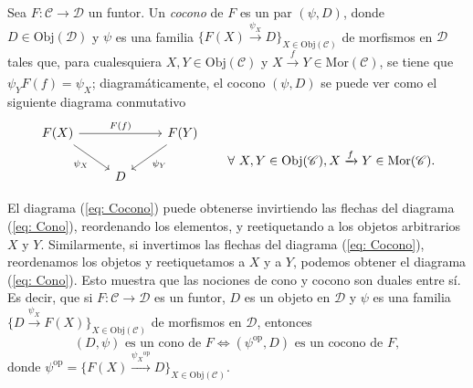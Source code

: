 \documentclass[tesis]{subfiles}
\begin{document}

\begin{Def} \label{Def: Cocono} 
    Sea $F:\mathscr{C}\to \mathscr{D}$ un funtor. Un \emph{cocono} de $F$ es un par $(\psi,D)$, donde $D\in\text{Obj}(\mathscr{D})$ y $\psi$ es una familia $\{F(X)\xrightarrow[]{\psi_X} D\}_{X\in\text{Obj}(\mathscr{C})}$ de morfismos en $\mathscr{D}$ tales que, para cualesquiera $X,Y\in\text{Obj}(\mathscr{C})$ y $X\xrightarrow[]{f} Y\in\text{Mor}(\mathscr{C})$, se tiene que $\psi_YF(f)=\psi_X$; diagramáticamente, el cocono $(\psi,D)$ se puede ver como el siguiente diagrama conmutativo
    \begin{equation}\label{eq: Cocono}
        \begin{tikzcd}
            F(X) \arrow[]{dr}[swap]{\psi_X} \arrow[]{rr}[]{F(f)} &&F(Y) \arrow[]{dl}[]{\psi_Y} &&&&\empty{} \arrow[phantom]{d}[]{\forall \ X,Y\in\text{Obj}(\mathscr{C}), X\xrightarrow[]{f} Y\in\text{Mor}(\mathscr{C}).} \\
                                                                 &D &&&&&\empty{} 
        \end{tikzcd}
    \end{equation}
\end{Def}

\begin{Obs}\label{Observaciones del cocono}
    El diagrama (\ref{eq: Cocono}) puede obtenerse invirtiendo las flechas del diagrama (\ref{eq: Cono}), reordenando los elementos, y reetiquetando a los objetos arbitrarios $X$ y $Y$. Similarmente, si invertimos las flechas del diagrama (\ref{eq: Cocono}), reordenamos los objetos y reetiquetamos a $X$ y a $Y$, podemos obtener el diagrama (\ref{eq: Cono}). Esto muestra que las nociones de cono y cocono son duales entre sí. Es decir, que si $F:\mathscr{C}\to \mathscr{D}$ es un funtor, $D$ es un objeto en $\mathscr{D}$ y $\psi$ es una familia $\{D\xrightarrow[]{\psi_X}F(X)\}_{X\in\text{Obj}(\mathscr{C})}$ de morfismos en $\mathscr{D}$, entonces
    \[
        (D,\psi) \text{ es un cono de } F \iff (\psi^\text{op},D) \text{ es un cocono de } F,
    \] 
    donde $\psi^\text{op} = \{F(X)\xrightarrow[]{\psi_X{}^\text{op}}D\}_{X\in\text{Obj}(\mathscr{C})}$.
\end{Obs}
\end{document}
